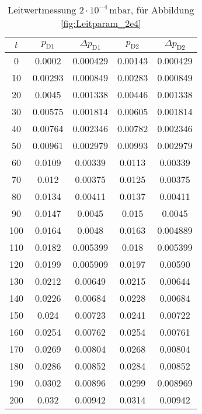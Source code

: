 \begin{table}[H]
    \centering
    \caption{Leitwertmessung $2 \cdot 10^{-4} \, \si{\milli\bar}$, für Abbildung \ref{fig:Leitparam_2e4}}
    \label{tab:Leitparam_2e4}
    \begin{tabular}{c c c c c}
        \toprule
        {$t$} & {$p_\text{D1}$} & {$\Delta p_\text{D1}$} & {$p_\text{D2}$} & {$\Delta p_\text{D2}$} \\
        \midrule
        0 & 0.0002 & 0.000429 & 0.00143 & 0.000429\\
        10 & 0.00293 & 0.000849 & 0.00283 & 0.000849\\
        20 & 0.0045 & 0.001338 & 0.00446 & 0.001338\\
        30 & 0.00575 & 0.001814 & 0.00605 & 0.001814\\
        40 & 0.00764 & 0.002346 & 0.00782 & 0.002346\\
        50 & 0.00961 & 0.002979 & 0.00993 & 0.002979\\
        60 & 0.0109 & 0.00339 & 0.0113 & 0.00339\\
        70 & 0.012 & 0.00375 & 0.0125 & 0.00375\\
        80 & 0.0134 & 0.00411 & 0.0137 & 0.00411\\
        90 & 0.0147 & 0.0045 & 0.015 & 0.0045\\
        100 & 0.0164 & 0.0048 & 0.0163 & 0.004889\\
        110 & 0.0182 & 0.005399 & 0.018 & 0.005399\\
        120 & 0.0199 & 0.005909 & 0.0197 & 0.00590\\
        130 & 0.0212 & 0.00649 & 0.0215 & 0.00644\\
        140 & 0.0226 & 0.00684 & 0.0228 & 0.00684\\
        150 & 0.024 & 0.00723 & 0.0241 & 0.00722\\
        160 & 0.0254 & 0.00762 & 0.0254 & 0.00761\\
        170 & 0.0269 & 0.00804 & 0.0268 & 0.00804\\
        180 & 0.0286 & 0.00852 & 0.0284 & 0.00852\\
        190 & 0.0302 & 0.00896 & 0.0299 & 0.008969\\
        200 & 0.032 & 0.00942 & 0.0314 & 0.00942\\
        \bottomrule
    \end{tabular}
\end{table}


